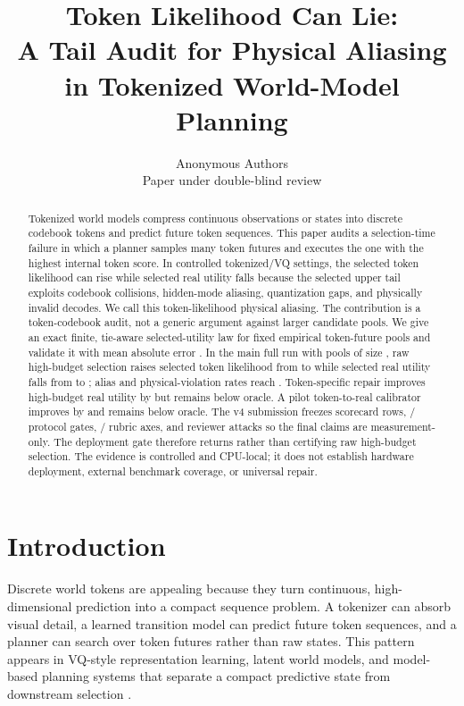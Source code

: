 \documentclass{article}
\title{Token Likelihood Can Lie:\\A Tail Audit for Physical Aliasing in Tokenized World-Model Planning}
\author{Anonymous Authors\\Paper under double-blind review}
\newcommand{\twma}{token-likelihood physical aliasing}
\begin{document}
\maketitle

\begin{abstract}
Tokenized world models compress continuous observations or states into discrete codebook tokens and predict future token sequences. This paper audits a selection-time failure in which a planner samples many token futures and executes the one with the highest internal token score. In controlled tokenized/VQ settings, the selected token likelihood can rise while selected real utility falls because the selected upper tail exploits codebook collisions, hidden-mode aliasing, quantization gaps, and physically invalid decodes. We call this \twma{}. The contribution is a token-codebook audit, not a generic argument against larger candidate pools. We give an exact finite, tie-aware selected-utility law for fixed empirical token-future pools and validate it with mean absolute error \VThreeLawMae{}. In the main full run with \VThreePools{} pools of size \VThreePoolSize{}, raw high-budget selection raises selected token likelihood from \VThreeRawTokenNOne{} to \VThreeRawTokenHigh{} while selected real utility falls from \VThreeRawRealNOne{} to \VThreeRawRealHigh{}; alias and physical-violation rates reach \VThreeRawAliasHigh{}. Token-specific repair improves high-budget real utility by \VThreeCombinedGain{} but remains \VThreeCombinedOracleGap{} below oracle. A pilot token-to-real calibrator improves by \VThreePilotGain{} and remains \VThreePilotOracleGap{} below oracle. The v4 submission freezes \VFourSubmissionRows{} scorecard rows, \VFourProtocolGatesPassed{}/\VFourProtocolGates{} protocol gates, \VFourRubricAxesPassed{}/\VFourRubricAxes{} rubric axes, and \VFourAttackRounds{} reviewer attacks so the final claims are measurement-only. The deployment gate therefore returns \VThreeGateAction{} rather than certifying raw high-budget selection. The evidence is controlled and CPU-local; it does not establish hardware deployment, external benchmark coverage, or universal repair.
\end{abstract}

\section{Introduction}

Discrete world tokens are appealing because they turn continuous, high-dimensional prediction into a compact sequence problem. A tokenizer can absorb visual detail, a learned transition model can predict future token sequences, and a planner can search over token futures rather than raw states. This pattern appears in VQ-style representation learning, latent world models, and model-based planning systems that separate a compact predictive state from downstream selection \citep{oord2017neural,ha2018world,hafner2019learning}.
\end{document}
